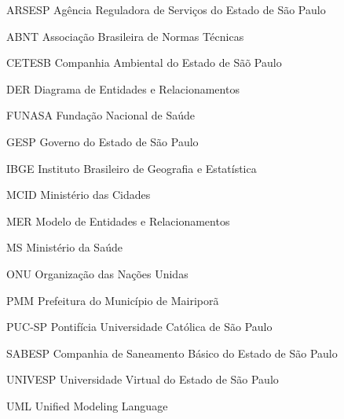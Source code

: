 \documentclass[
    12pt, %
    openright, %
    oneside, %
    a4paper, %
    chapter=TITLE,
    english, %
    french, %
    spanish, %
    brazil, %
    sumario=tradicional
]{abntex2}
\begin{document}
    
    \pretextual
    \imprimircapa
    \imprimirfolhaderosto*

    

    \cleardoublepage    
    

    \listoffigures*
    \cleardoublepage

    \listoftables*
    \cleardoublepage

    \begin{siglas}
        \item[ARSESP]   Agência Reguladora de Serviços do Estado de São Paulo
        \item[ABNT]     Associação Brasileira de Normas Técnicas
        \item[CETESB]   Companhia Ambiental do Estado de Sãõ Paulo
        \item[DER]      Diagrama de Entidades e Relacionamentos 
        \item[FUNASA]   Fundação Nacional de Saúde 
        \item[GESP]     Governo do Estado de São Paulo
        \item[IBGE]     Instituto Brasileiro de Geografia e Estatística
        \item[MCID]     Ministério das Cidades
        \item[MER]      Modelo de Entidades e Relacionamentos 
        \item[MS]       Ministério da Saúde 
        \item[ONU]      Organização das Nações Unidas 
        \item[PMM]      Prefeitura do Município de Mairiporã
        \item[PUC-SP]   Pontifícia Universidade Católica de São Paulo 
        \item[SABESP]   Companhia de Saneamento Básico do Estado de São Paulo
        \item[UNIVESP]  Universidade Virtual do Estado de São Paulo
        \item[UML]      Unified Modeling Language 
        
    \end{siglas}



    
    
    \tableofcontents*
    \textual

    

    
    

    \postextual

    
\end{document}
